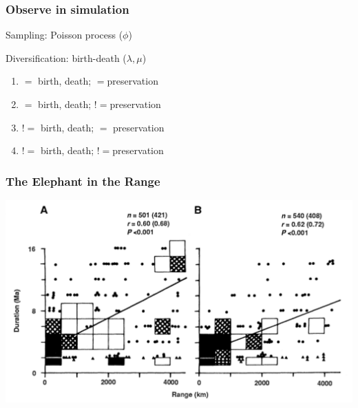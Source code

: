 \documentclass{beamer}
\begin{document}
\begin{frame}
  \frametitle{Observe in simulation}

  Sampling: Poisson process (\(\phi\))

  Diversification: birth-death (\(\lambda, \mu\))

  \begin{enumerate}
    \item \(=\) birth, death; \(=\)preservation
    \item \(=\) birth, death; \(!=\)preservation
    \item \(!=\) birth, death; \(=\) preservation
    \item \(!=\) birth, death; \(!=\)preservation
  \end{enumerate}

\end{frame}

\begin{frame}
  \frametitle{The Elephant in the Range}
  \begin{center}
    \includegraphics[height = 0.8\textheight, width = \textwidth,  keepaspectratio = true]{figure/range}

    \tiny{}
  \end{center}
\end{frame}
\end{document}

